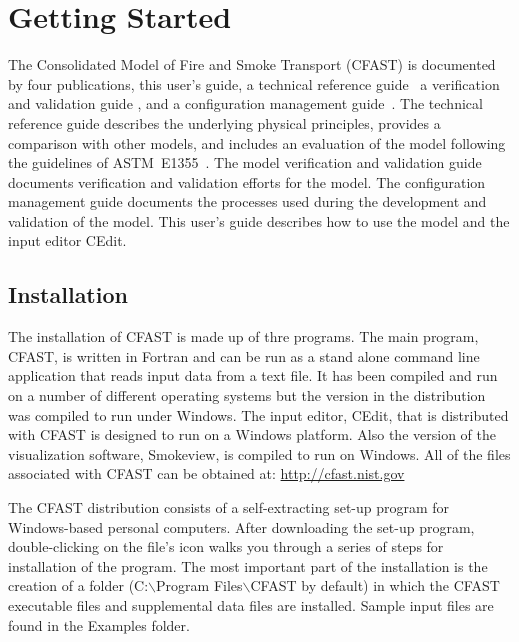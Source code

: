 
\chapter{Getting Started}

The Consolidated Model of Fire and Smoke Transport (CFAST) is documented by four publications, this user's guide, a technical reference guide~\cite{CFAST_Tech_Guide_7} a verification and validation guide \cite{CFAST_Valid_Guide_7}, and a configuration management guide~\cite{CFAST_Config_Guide_7}. The technical reference guide describes the underlying physical principles, provides a comparison with other models, and includes an evaluation of the model following the guidelines of ASTM~E1355~\cite{ASTM:E1355}. The model verification and validation guide documents verification and validation efforts for the model. The configuration management guide documents the processes used during the development and validation of the model. This user's guide describes how to use the model and the input editor CEdit.

\section{Installation}

The installation of CFAST is made up of thre programs. The main program, CFAST, is written in Fortran and can be run as a stand alone command line application that reads input data from a text file. It has been compiled and run on a number of different operating systems but the version in the distribution was compiled to run under Windows. The input editor, CEdit, that is distributed with CFAST is designed to run on a Windows platform. Also the version of the visualization software, Smokeview, is compiled to run on Windows. All of the files associated with CFAST can be obtained at: \url{http://cfast.nist.gov}

The CFAST distribution consists of a self-extracting set-up program for Windows-based personal computers. After downloading the set-up program, double-clicking on the file's icon walks you through a series of steps for installation of the program.  The most important part of the installation is the creation of a folder ({\ct C:$\backslash$Program Files$\backslash$CFAST} by default) in which the CFAST executable files and supplemental data files are installed.  Sample input files are found in the {\ct Examples} folder.

